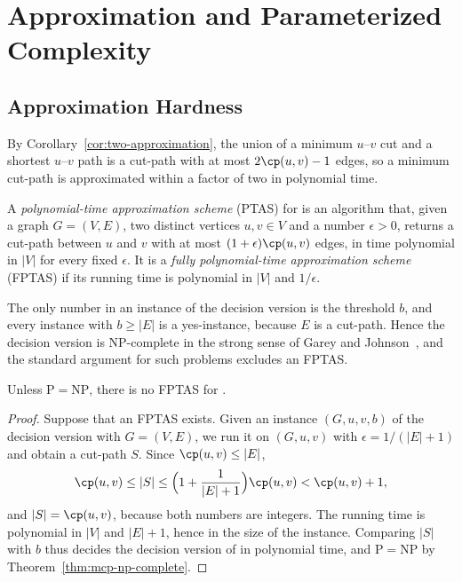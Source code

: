 
\section{Approximation and Parameterized Complexity}
\label{sec:approx-param}

\subsection{Approximation Hardness}
\label{sec:approximation}

By Corollary~\ref{cor:two-approximation}, the union of a minimum $u$--$v$ cut and a shortest $u$--$v$ path is a cut-path with at most $2\cp(u,v) - 1$ edges, so a minimum cut-path is approximated within a factor of two in polynomial time.

A \emph{polynomial-time approximation scheme} (PTAS) for \MinCutPath{} is an algorithm that, given a graph $G = (V, E)$, two distinct vertices $u, v \in V$ and a number $\epsilon > 0$, returns a cut-path between $u$ and $v$ with at most $(1+\epsilon)\cp(u,v)$ edges, in time polynomial in $|V|$ for every fixed $\epsilon$.
It is a \emph{fully polynomial-time approximation scheme} (FPTAS) if its running time is polynomial in $|V|$ and $1/\epsilon$.

The only number in an instance of the decision version is the threshold $b$, and every instance with $b \geq |E|$ is a yes-instance, because $E$ is a cut-path.
Hence the decision version is NP-complete in the strong sense of Garey and Johnson~\cite{GareyJohnson1978Strong}, and the standard argument for such problems excludes an FPTAS.

\begin{theorem}
\label{thm:no-fptas}
Unless $\mathrm{P} = \mathrm{NP}$, there is no FPTAS for \MinCutPath.
\end{theorem}

\begin{proof}
Suppose that an FPTAS exists.
Given an instance $(G, u, v, b)$ of the decision version with $G = (V, E)$, we run it on $(G, u, v)$ with $\epsilon = 1/(|E|+1)$ and obtain a cut-path $S$.
Since $\cp(u,v) \leq |E|$,
\[
\cp(u,v) \leq |S| \leq \Bigl(1 + \frac{1}{|E|+1}\Bigr)\cp(u,v) < \cp(u,v) + 1,
\]
and $|S| = \cp(u,v)$, because both numbers are integers.
The running time is polynomial in $|V|$ and $|E| + 1$, hence in the size of the instance.
Comparing $|S|$ with $b$ thus decides the decision version of \MinCutPath{} in polynomial time, and $\mathrm{P} = \mathrm{NP}$ by Theorem~\ref{thm:mcp-np-complete}.
\end{proof}

